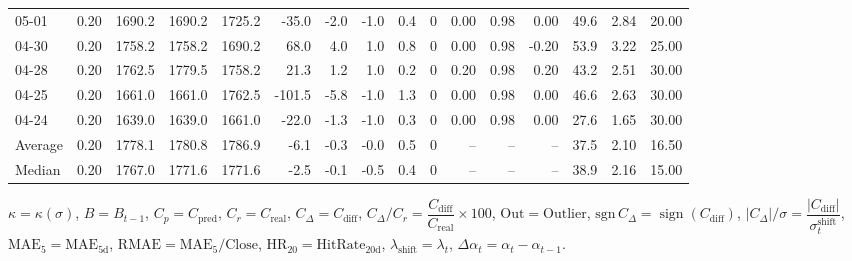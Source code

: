 \begin{threeparttable}
{\begin{tabular}{lrrrrrrrrrrrrrrr}
  05-01 &     0.20 & 1690.2 & 1690.2 & 1725.2 &      -35.0 &           -2.0 &                     -1.0 &                 0.4 &              0 &       0.00 &      0.98 &           0.00 &             49.6 &            2.84 &                  20.00 \\
  04-30 &     0.20 & 1758.2 & 1758.2 & 1690.2 &       68.0 &            4.0 &                      1.0 &                 0.8 &              0 &       0.00 &      0.98 &          -0.20 &             53.9 &            3.22 &                  25.00 \\
  04-28 &     0.20 & 1762.5 & 1779.5 & 1758.2 &       21.3 &            1.2 &                      1.0 &                 0.2 &              0 &       0.20 &      0.98 &           0.20 &             43.2 &            2.51 &                  30.00 \\
  04-25 &     0.20 & 1661.0 & 1661.0 & 1762.5 &     -101.5 &           -5.8 &                     -1.0 &                 1.3 &              0 &       0.00 &      0.98 &           0.00 &             46.6 &            2.63 &                  30.00 \\
  04-24 &     0.20 & 1639.0 & 1639.0 & 1661.0 &      -22.0 &           -1.3 &                     -1.0 &                 0.3 &              0 &       0.00 &      0.98 &           0.00 &             27.6 &            1.65 &                  30.00 \\
Average &     0.20 & 1778.1 & 1780.8 & 1786.9 &       -6.1 &           -0.3 &                     -0.0 &                 0.5 &              0 &         -- &        -- &             -- &             37.5 &            2.10 &                  16.50 \\
 Median &     0.20 & 1767.0 & 1771.6 & 1771.6 &       -2.5 &           -0.1 &                     -0.5 &                 0.4 &              0 &         -- &        -- &             -- &             38.9 &            2.16 &                  15.00 \\
\bottomrule
\end{tabular}
}
\begin{tablenotes}\footnotesize
\item $\kappa=\kappa(\sigma)$, $B=B_{t-1}$, $C_p=C_{\text{pred}}$, $C_r=C_{\text{real}}$, $C_\Delta=C_{\text{diff}}$, $C_\Delta/C_r=\dfrac{C_{\text{diff}}}{C_{\text{real}}}\times100$, $\mathrm{Out}=\text{Outlier}$, $\mathrm{sgn}\,C_\Delta=\operatorname{sign}(C_{\text{diff}})$, $|C_\Delta|/\sigma=\dfrac{|C_{\text{diff}}|}{\sigma_t^{\text{shift}}}$, $\mathrm{MAE}_5=\mathrm{MAE}_{5\text{d}}$, $\mathrm{RMAE}= \mathrm{MAE}_5 / \text{Close}$, $\mathrm{HR}_{20}=\mathrm{HitRate}_{20\text{d}}$, 
$\lambda_{\text{shift}}=\lambda_t$, 
$\Delta\alpha_t=\alpha_t-\alpha_{t-1}$.
\end{tablenotes}
\end{threeparttable}
\endgroup

